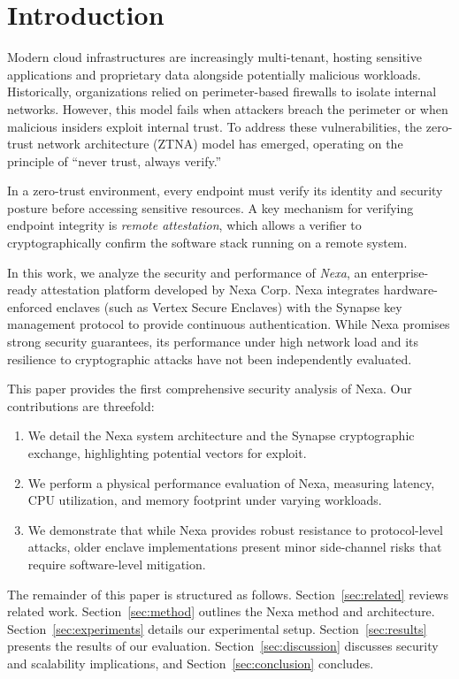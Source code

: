 \section{Introduction}
Modern cloud infrastructures are increasingly multi-tenant, hosting sensitive applications and proprietary data alongside potentially malicious workloads. Historically, organizations relied on perimeter-based firewalls to isolate internal networks. However, this model fails when attackers breach the perimeter or when malicious insiders exploit internal trust. To address these vulnerabilities, the zero-trust network architecture (ZTNA) model has emerged, operating on the principle of ``never trust, always verify.''

In a zero-trust environment, every endpoint must verify its identity and security posture before accessing sensitive resources. A key mechanism for verifying endpoint integrity is \emph{remote attestation}, which allows a verifier to cryptographically confirm the software stack running on a remote system.

In this work, we analyze the security and performance of \emph{Nexa}, an enterprise-ready attestation platform developed by Nexa Corp. Nexa integrates hardware-enforced enclaves (such as Vertex Secure Enclaves) with the Synapse key management protocol to provide continuous authentication. While Nexa promises strong security guarantees, its performance under high network load and its resilience to cryptographic attacks have not been independently evaluated.

This paper provides the first comprehensive security analysis of Nexa. Our contributions are threefold:
\begin{enumerate}
    \item We detail the Nexa system architecture and the Synapse cryptographic exchange, highlighting potential vectors for exploit.
    \item We perform a physical performance evaluation of Nexa, measuring latency, CPU utilization, and memory footprint under varying workloads.
    \item We demonstrate that while Nexa provides robust resistance to protocol-level attacks, older enclave implementations present minor side-channel risks that require software-level mitigation.
\end{enumerate}

The remainder of this paper is structured as follows. Section~\ref{sec:related} reviews related work. Section~\ref{sec:method} outlines the Nexa method and architecture. Section~\ref{sec:experiments} details our experimental setup. Section~\ref{sec:results} presents the results of our evaluation. Section~\ref{sec:discussion} discusses security and scalability implications, and Section~\ref{sec:conclusion} concludes.
